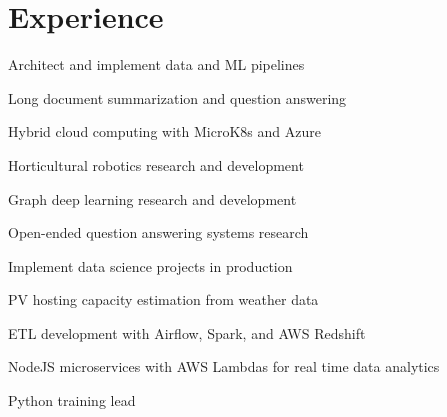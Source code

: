 \documentclass[letterpaper]{deedy-resume} %
\begin{document}
\begin{minipage}[t]{0.66\textwidth} %


\section{Experience}
\vspace{\topsep}
\begin{tightitemize}
\item Architect and implement data and ML pipelines
\item Long document summarization and question answering
\item Hybrid cloud computing with MicroK8s and Azure
\end{tightitemize}
\sectionspace


\begin{tightitemize}
\item Horticultural robotics research and development
\item Graph deep learning research and development
\item Open-ended question answering systems research
\end{tightitemize}

\sectionspace


\begin{tightitemize}
\item Implement data science projects in production
\item PV hosting capacity estimation from weather data
\end{tightitemize}
\sectionspace

\begin{tightitemize}
\item ETL development with Airflow, Spark, and AWS Redshift
\item NodeJS microservices with AWS Lambdas for real time data analytics
\item Python training lead
\end{tightitemize}


\end{minipage}
\end{document}

